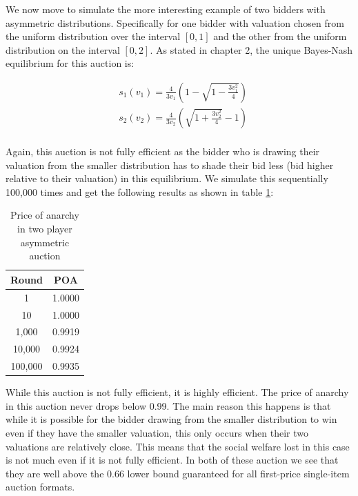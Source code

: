 \documentclass[12pt,twoside]{reedthesis}
\begin{document}
We now move to simulate the more interesting example of two bidders with asymmetric distributions. Specifically for one bidder with valuation chosen from the uniform distribution over the interval $[ 0,1]$ and the other from the uniform distribution on the interval $[0,2]$. As stated in chapter 2, the unique Bayes-Nash equilibrium for this auction is:

\begin{align*}
&s_1(v_1) = \frac{4}{3 v_1} \left(1 - \sqrt{1 - \frac{3v_1^2}{4}}\right)\\
&s_2(v_2) = \frac{4}{3 v_2} \left(\sqrt{1 + \frac{3v_2^2}{4}} - 1 \right)\\
\end{align*}

Again, this auction is not fully efficient as the bidder who is drawing their valuation from the smaller distribution has to shade their bid less (bid higher relative to their valuation) in this equilibrium. We simulate this sequentially 100,000 times and get the following results as shown in table \ref{table:2}:
\begin{table}[h!]
	\begin{center}
		\begin{tabular}{ |c|c| }
			\hline
			Round & POA \\
			\hline
			1 & 1.0000 \\
			10 & 1.0000 \\
			1,000 & 0.9919 \\
			10,000 & 0.9924 \\
			100,000 & 0.9935 \\
			\hline
		\end{tabular}
		\caption{Price of anarchy in two player asymmetric auction}
		\label{table:2}
	\end{center} 
\end{table}

While this auction is not fully efficient, it is highly efficient. The price of anarchy in this auction never drops below 0.99. The main reason this happens is that while it is possible for the bidder drawing from the smaller distribution to win even if they have the smaller valuation, this only occurs when their two valuations are relatively close. This means that the social welfare lost in this case is not much even if it is not fully efficient. In both of these auction we see that they are well above the $0.66$ lower bound guaranteed for all first-price single-item auction formats.
\end{document}
